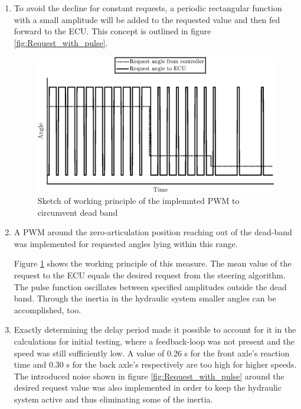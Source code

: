 \documentclass[root.tex]{subfiles}
\begin{document}
	\begin{enumerate}

		\item To avoid the decline for constant requests, a periodic rectangular function with a small amplitude will be added to the requested value and then fed forward to the \gls{ECU}. This concept is outlined in figure \ref{fig:Request_with_pulse}. 
		
		

	\begin{figure}[h!]
		\centering
		\includegraphics[width=1\linewidth]{Deadband}
		\caption[Sketch of working princiiple of the implemnted PWM to circumvent dead band]{Sketch of working principle of the implemnted PWM to circumvent dead band}
		\label{fig:Deadband}
	\end{figure}
	
		\item A \gls{PWM} around the zero-articulation position reaching out of the dead-band was implemented for requested angles lying within this range. 
		
		
		
		Figure \ref{fig:Deadband} shows the working principle of this measure. The mean value of the request to the \gls{ECU} equals the desired request from the steering algorithm. The pulse function oscillates between specified amplitudes outside the dead band. Through the inertia in the hydraulic system smaller angles can be accomplished, too.
				
		\item Exactly determining the delay period made it possible to account for it in the calculations for initial testing, where a feedback-loop was not present and the speed was still sufficiently low. A value of 0.26 \unit{s} for the front axle's reaction time and 0.30 \unit{s} for the back axle's respectively are too high for higher speeds.\\
		The introduced noise shown in figure \ref{fig:Request_with_pulse} around the desired request value was also implemented in order to keep the hydraulic system active and thus eliminating some of the inertia. 
	\end{enumerate}
	
	
	
	
	
	
\end{document}

